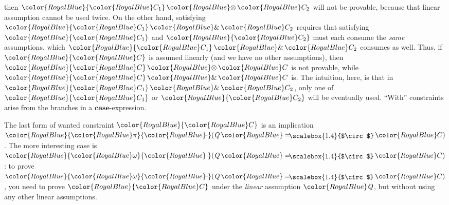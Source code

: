 \documentclass[acmsmall,usenames,dvipsnames,natbib=false,acmthm=false,screen]{acmart}
\newcommand{\constraintcolour}{\color{RoyalBlue}}
\newcommand{\constraintfont}[1]{{\constraintcolour#1}}
\newcommand{\multiplicitycolour}{\color{RoyalBlue}}
\newcommand{\multiplicityfont}[1]{{\multiplicitycolour#1}}
\newcommand{\scale}{\constraintfont{\cdot}}
\newcommand{\constraintop}[1]{\mathop{\constraintfont{#1}}}
\newcommand{\aand}{\constraintop{\&}}
\newcommand{\lollycirc}{\raisebox{-0.255ex}{\scalebox{1.4}{$\circ$}}}
\newcommand{\Lolly}{\constraintop{=\kern-1.1ex \lollycirc}}
\newcommand{\qtensor}{\constraintop{\otimes}}
\newcommand{\keyword}[1]{\mathbf{#1}}
\newcommand{\kcase}{\keyword{case}}
\theoremstyle{acmplain}
\theoremstyle{acmdefinition}
\begin{document}
then $  \constraintfont{ \constraintfont{C_{{\mathrm{1}}}}  \qtensor  \constraintfont{C_{{\mathrm{2}}}} }  $ will not be provable, because that linear assumption cannot
be used twice. On the
other hand, satisfying $  \constraintfont{ \constraintfont{C_{{\mathrm{1}}}}  \aand  \constraintfont{C_{{\mathrm{2}}}} }  $ requires that satisfying $  \constraintfont{ \constraintfont{C_{{\mathrm{1}}}} }  $
and $  \constraintfont{ \constraintfont{C_{{\mathrm{2}}}} }  $ must each
consume the \emph{same} assumptions, which $  \constraintfont{ \constraintfont{C_{{\mathrm{1}}}}  \aand  \constraintfont{C_{{\mathrm{2}}}} }  $ consumes as well.
Thus, if $  \constraintfont{ \constraintfont{C} }  $ is assumed linearly (and we have no other assumptions),
then $  \constraintfont{ \constraintfont{C}  \qtensor  \constraintfont{C} }  $ is not provable, while $  \constraintfont{ \constraintfont{C}  \aand  \constraintfont{C} }  $ is.
The intuition, here, is that in $  \constraintfont{ \constraintfont{C_{{\mathrm{1}}}}  \aand  \constraintfont{C_{{\mathrm{2}}}} }  $, only
one of $  \constraintfont{ \constraintfont{C_{{\mathrm{1}}}} }  $ or $  \constraintfont{ \constraintfont{C_{{\mathrm{2}}}} }  $ will be eventually used. ``With'' constraints
arise from the branches in a $\kcase$-expression.

The last form of wanted constraint $  \constraintfont{ \constraintfont{C} }  $ is an implication
$  \constraintfont{   \multiplicityfont{ \pi }  \scale( \ottnt{Q}  \Lolly  \constraintfont{C} )  }  $. The more interesting case is $  \constraintfont{   \multiplicityfont{ \omega }  \scale( \ottnt{Q}  \Lolly  \constraintfont{C} )  }  $:
to prove $  \constraintfont{   \multiplicityfont{ \omega }  \scale( \ottnt{Q}  \Lolly  \constraintfont{C} )  }  $, you need to prove $  \constraintfont{ \constraintfont{C} }  $ under the
\emph{linear} assumption $  \constraintfont{ \ottnt{Q} }  $, but without using any other linear
assumptions.
\end{document}
